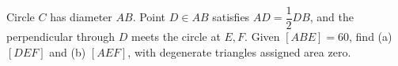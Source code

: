 Circle $C$ has diameter $AB$. Point $D\in AB$ satisfies $AD=\dfrac{1}{2}DB$, and the perpendicular through $D$ meets the circle at $E,F$. Given $[ABE]=60$, find (a) $[DEF]$ and (b) $[AEF]$, with degenerate triangles assigned area zero.
